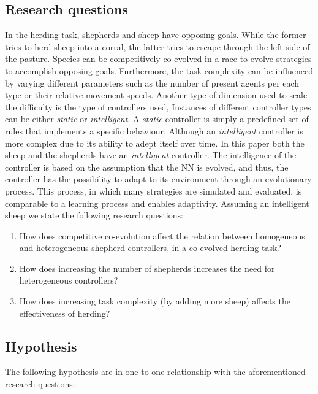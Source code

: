 \documentclass[conference]{IEEEtran}
\begin{document}
\subsection{Research questions}
\label{sec:researchQuestions}
In the herding task, shepherds and sheep have opposing goals.
While the former tries to herd sheep into a corral, the latter tries to escape through the left side of the pasture. 
Species can be competitively co-evolved in a race to evolve strategies to accomplish opposing goals. 
Furthermore, the task complexity can be influenced by varying different parameters such as the number of present agents per each type or their relative movement speeds. 
Another type of dimension used to scale the difficulty is the type of controllers used,
Instances of different controller types can be either \textit{static} or \textit{intelligent}.
A \textit{static} controller is simply a predefined set of rules that implements a specific behaviour.
Although an \textit{intelligent} controller is more complex due to its ability to adept itself over time.
In this paper both the sheep and the shepherds have an \textit{intelligent} controller.
The intelligence of the controller is based on the assumption that the NN is evolved, and thus, the controller has the possibility to adapt to its environment through an evolutionary process. 
This process, in which many strategies are simulated and evaluated, is comparable to a learning process and enables adaptivity. 
Assuming an intelligent sheep we state the following research questions:

\begin{enumerate}
	\item How does competitive co-evolution affect the relation between homogeneous and heterogeneous shepherd controllers, in a co-evolved herding task?
	
	\item How does increasing the number of shepherds increases the need for heterogeneous controllers?
	\item How does increasing task complexity (by adding more sheep) affects the effectiveness of herding?
\end{enumerate}

\subsection{Hypothesis}
\label{sec:hypothesis}
The following hypothesis are in one to one relationship with the aforementioned research questions:
\end{document}
